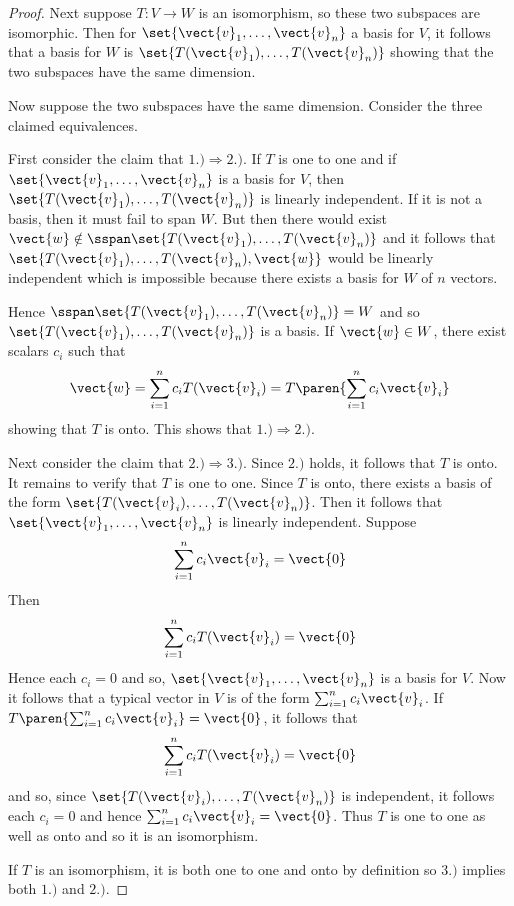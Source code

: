 \begin{proof}
Next suppose $T:V \to W$ is an isomorphism, so these two subspaces are isomorphic. Then for $\set{\vect{v}_{1},\ldots,\vect{v}_{n}} $ a
basis for $V$, it follows that a basis for $W$
is $\set{T(\vect{v}_{1}),\ldots,T(\vect{v}_{n})} $ showing that the two
subspaces have the same dimension.

Now suppose the two subspaces have the same dimension. Consider the three
claimed equivalences.

First consider the claim that $1.)\Rightarrow 2.)$. If $T$ is one to one and if $\set{\vect{v}_{1},\ldots,\vect{v}
_{n}} $ is a basis for $V$, then $\set{T(\vect{v}_{1}),\ldots,T(\vect{v
}_{n})} $ is linearly independent. If it is not a basis, then it must
fail to span $W$. But then there would exist $\vect{w}\notin \sspan
\set{T(\vect{v}_{1}),\ldots,T(\vect{v}_{n})} $ and it follows that $\set{T(\vect{v}_{1}),\ldots,T(\vect{v}_{n}),\vect{w}
} $ would be linearly independent which is impossible because there exists a basis for $W$ of $n$ vectors.

Hence $\sspan\set{T(\vect{v}_{1}),\ldots,T(\vect{v}_{n})} =W$ and
so $\set{T(\vect{v}_{1}),\ldots,T(\vect{v}_{n})} $ is a basis. If $\vect{w}\in W$, there exist scalars $c_{i}$ such that 
\begin{equation*}
\vect{w}=\sum_{i=1}^{n}c_{i}T(\vect{v}_{i})=T\paren{\sum_{i=1}^{n}c_{i}\vect{v}
_{i}}
\end{equation*}
showing that $T$ is onto. This shows that $1.)\Rightarrow 2.)$.

Next consider the claim that $2.)\Rightarrow 3.)$. Since $2.)$ holds, it
follows that $T$ is onto. It remains to verify that $T$ is one to one. Since 
$T$ is onto, there exists a basis of the form $\set{T(\vect{v}_{i}),\ldots,T(\vect{v}_{n})}$. Then it follows that $\set{\vect{v}_{1},\ldots,
\vect{v}_{n}} $ is linearly independent. Suppose 
\begin{equation*}
\sum_{i=1}^{n}c_{i}\vect{v}_{i}=\vect{0}
\end{equation*}
Then 
\begin{equation*}
\sum_{i=1}^{n}c_{i}T(\vect{v}_{i})=\vect{0}
\end{equation*}
Hence each $c_{i}=0$ and so, $\set{\vect{v}_{1},\ldots,\vect{v}
_{n}} $ is a basis for $V$. Now it follows that a typical vector in $
V $ is of the form $\sum_{i=1}^{n}c_{i}\vect{v}_{i}$. If $T\paren{
\sum_{i=1}^{n}c_{i}\vect{v}_{i}} =\vect{0}$, it follows that 
\begin{equation*}
\sum_{i=1}^{n}c_{i}T(\vect{v}_{i})=\vect{0}
\end{equation*}
and so, since $\set{T(\vect{v}_{i}),\ldots,T(\vect{v}_{n})} $ is
independent, it follows each $c_{i}=0$ and hence $\sum_{i=1}^{n}c_{i}\vect{v}
_{i}=\vect{0}$. Thus $T$ is one to one as well as onto and so it is an
isomorphism.

If $T$ is an isomorphism, it is both one to one and onto by definition so $
3.)$ implies both $1.)$ and $2.)$.
\end{proof}

